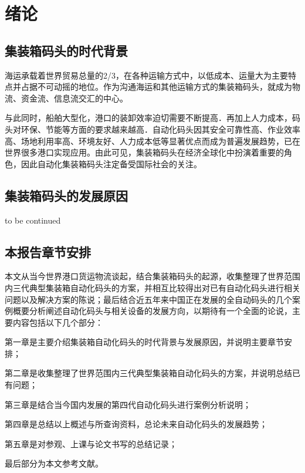 \newpage
\section{绪论}
\subsection{集装箱码头的时代背景}

海运承载着世界贸易总量的2/3，在各种运输方式中，以低成本、运量大为主要特点并占据不可动摇的地位。作为沟通海运和其他运输方式的集装箱码头，就成为物流、资金流、信息流交汇的中心。

与此同时，船舶大型化，港口的装卸效率迫切需要不断提高．再加上人力成本，码头对环保、节能等方面的要求越来越高．自动化码头因其安全可靠性高、作业效率高、场地利用率高、环境友好、人力成本低等显著优点而成为普遍发展趋势，已在世界很多港口实现应用。由此可见，集装箱码头在经济全球化中扮演着重要的角色，因此自动化集装箱码头注定备受国际社会的关注。

\subsection{集装箱码头的发展原因}

to be continued

\subsection{本报告章节安排}

本文从当今世界港口货运物流谈起，结合集装箱码头的起源，收集整理了世界范围内三代典型集装箱自动化码头的方案，并相互比较得出对已有自动化码头进行相关问题以及解决方案的陈说；最后结合近五年来中国正在发展的全自动码头的几个案例概要分析阐述自动化码头与相关设备的发展方向，以期待有一个全面的论说，主要内容包括以下几个部分：

第一章是主要介绍集装箱自动化码头的时代背景与发展原因，并说明主要章节安排；

第二章是收集整理了世界范围内三代典型集装箱自动化码头的方案，并说明总结已有问题；

第三章是结合当今国内发展的第四代自动化码头进行案例分析说明；

第四章是总结以上概述与所查询资料，总论未来自动化码头的发展趋势；

第五章是对参观、上课与论文书写的总结记录；

最后部分为本文参考文献。